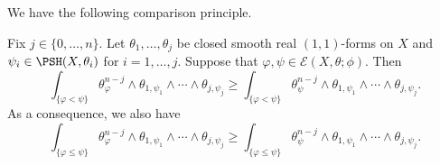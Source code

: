 We have the following comparison principle.
\begin{proposition}\label{prop:compa_princ}
    Fix $j\in \{0,\ldots,n\}$.
    Let $\theta_1,\ldots,\theta_j$ be closed smooth real $(1,1)$-forms on $X$ and $\psi_i\in \PSH(X,\theta_i)$ for $i=1,\ldots,j$. Suppose that $\varphi,\psi\in \mathcal{E}(X,\theta;\phi)$. Then
    \begin{equation}\label{eq:comp_princi1}
    \int_{\{\varphi<\psi\}} \theta_{\varphi}^{n-j} \wedge \theta_{1,\psi_1}\wedge \cdots \wedge \theta_{j,\psi_j}\geq \int_{\{\varphi<\psi\}} \theta_{\psi}^{n-j} \wedge \theta_{1,\psi_1}\wedge \cdots \wedge \theta_{j,\psi_j}.
    \end{equation}
    As a consequence, we also have
    \begin{equation}\label{eq:comp_princi12}
    \int_{\{\varphi\leq \psi\}} \theta_{\varphi}^{n-j} \wedge \theta_{1,\psi_1}\wedge \cdots \wedge \theta_{j,\psi_j}\geq \int_{\{\varphi\leq\psi\}} \theta_{\psi}^{n-j} \wedge \theta_{1,\psi_1}\wedge \cdots \wedge \theta_{j,\psi_j}.
    \end{equation}
\end{proposition}
